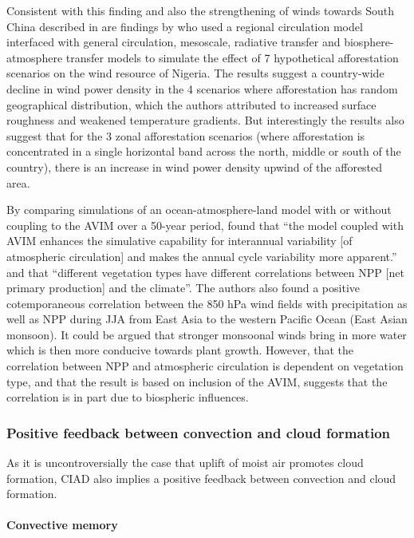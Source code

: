 Consistent with this finding and also the strengthening of winds towards South China described in \citep{li2020} are findings by \citet{matthew2017} who used a regional circulation model interfaced with general circulation, mesoscale, radiative transfer and biosphere-atmosphere transfer models to simulate the effect of 7 hypothetical afforestation scenarios on the wind resource of Nigeria. The results suggest a country-wide decline in wind power density in the 4 scenarios where afforestation has random geographical distribution, which the authors attributed to increased surface roughness and weakened temperature gradients. But interestingly the results also suggest that for the 3 zonal afforestation scenarios (where afforestation is concentrated in a single horizontal band across the north, middle or south of the country), there is an increase in wind power density upwind of the afforested area.

By comparing simulations of an ocean-atmosphere-land model with or without coupling to the \ac{AVIM} over a 50-year period, \citet{zhi2009} found that “the model coupled with AVIM enhances the simulative capability for interannual variability [of atmospheric circulation] and makes the annual cycle variability more apparent.” and that “different vegetation types have different correlations between NPP [net primary production] and the climate”. The authors also found a positive cotemporaneous correlation between the 850 hPa wind fields with precipitation as well as \ac{NPP} during \ac{JJA} from East Asia to the western Pacific Ocean (East Asian monsoon). It could be argued that stronger monsoonal winds bring in more water which is then more conducive towards plant growth. However, that the correlation between \ac{NPP} and atmospheric circulation is dependent on vegetation type, and that the result is based on inclusion of the \ac{AVIM}, suggests that the correlation is in part due to biospheric influences.

\subsubsection{Positive feedback between convection and cloud formation}

As it is uncontroversially the case that uplift of moist air promotes cloud formation, \ac{CIAD} also implies a positive feedback between convection and cloud formation.

\paragraph{Convective memory}

